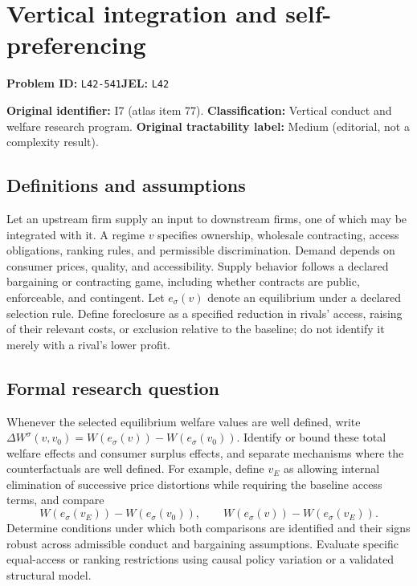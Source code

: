 \documentclass[11pt,a4paper]{article}
\begin{document}
\section*{Vertical integration and self-preferencing}
\textbf{Problem ID:} \texttt{L42-541}\quad \textbf{JEL:} \texttt{L42}\par
\label{problem:OP-0077}
\label{atlas:prob:I7}

\noindent\textbf{Original identifier:} I7 (atlas item 77). \textbf{Classification:} Vertical conduct and welfare research program. \textbf{Original tractability label:} Medium (editorial, not a complexity result).

\subsection*{Definitions and assumptions}

Let an upstream firm supply an input to downstream firms, one of which may be integrated with it. A regime $v$ specifies ownership, wholesale contracting, access obligations, ranking rules, and permissible discrimination. Demand depends on consumer prices, quality, and accessibility. Supply behavior follows a declared bargaining or contracting game, including whether contracts are public, enforceable, and contingent. Let $e_\sigma(v)$ denote an equilibrium under a declared selection rule. Define foreclosure as a specified reduction in rivals' access, raising of their relevant costs, or exclusion relative to the baseline; do not identify it merely with a rival's lower profit.

\subsection*{Formal research question}

Whenever the selected equilibrium welfare values are well defined, write $\Delta W^\sigma(v,v_0)=W(e_\sigma(v))-W(e_\sigma(v_0))$. Identify or bound these total welfare effects and consumer surplus effects, and separate mechanisms where the counterfactuals are well defined. For example, define $v_E$ as allowing internal elimination of successive price distortions while requiring the baseline access terms, and compare
\[
W(e_\sigma(v_E))-W(e_\sigma(v_0)),\qquad
W(e_\sigma(v))-W(e_\sigma(v_E)).
\]
Determine conditions under which both comparisons are identified and their signs robust across admissible conduct and bargaining assumptions. Evaluate specific equal-access or ranking restrictions using causal policy variation or a validated structural model.
\end{document}

